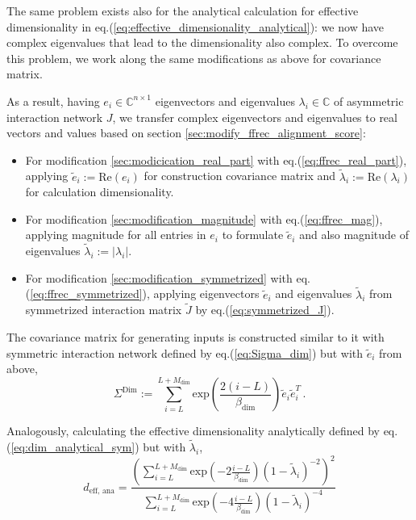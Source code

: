 \documentclass[11pt]{article}
\begin{document}
	The same problem exists also for the analytical calculation for effective dimensionality in  eq.(\ref{eq:effective_dimensionality_analytical}): we now have complex eigenvalues that lead to the dimensionality also complex. To overcome this problem, we work along the same modifications as above for covariance matrix.
				  
	As a result, having $e_i \in \mathbb{C}^{n \times 1}$ eigenvectors and eigenvalues $\lambda_i \in \mathbb{C}$ of asymmetric interaction network $J$, we transfer complex eigenvectors and eigenvalues to real vectors and values based on section \ref{sec:modify_ffrec_alignment_score}: 
	  \begin{itemize}
			  	\item For modification \ref{sec:modicication_real_part} with eq.(\ref{eq:ffrec_real_part}), applying $\tilde{e}_i := \text{Re}(e_i)$ for construction covariance matrix and $\tilde{\lambda}_i := \text{Re}(\lambda_i)$ for calculation dimensionality.
			  	\item For modification \ref{sec:modification_magnitude} with eq.(\ref{eq:ffrec_mag}), applying magnitude for all entries in $e_i$ to formulate $\tilde{e}_i$ and  also magnitude of eigenvalues $\tilde{\lambda}_i := \vert \lambda_i \vert$. 
			  	\item For modification \ref{sec:modification_symmetrized} with eq.(\ref{eq:ffrec_symmetrized}), applying eigenvectors $\tilde{e}_i$ and eigenvalues $\tilde{\lambda}_i$ from symmetrized interaction matrix $\tilde{J}$ by  eq.(\ref{eq:symmetrized_J}).
	  \end{itemize}
			  		
  	 The covariance matrix for generating inputs is constructed similar to it with symmetric interaction network defined by  eq.(\ref{eq:Sigma_dim}) but with $\tilde{e}_i$ from above, 
  	  	\begin{equation} \label{eq:modifications_dim}
  	  		\Sigma^{\text{Dim}} := \sum_{i=L}^{L+M_{\text{dim}}} \text{exp}\left(\frac{2(i-L)}{\beta_{\text{dim}}}\right) \tilde{e}_i \tilde{e}_i^T \, .
  	  	\end{equation}
		  	  	
 	  Analogously, calculating the effective dimensionality analytically defined by eq.(\ref{eq:dim_analytical_sym}) but with $\tilde{\lambda}_i$,
  	  	  	\begin{equation} \label{eq:modification_eff_dim}
  	  	  		d_{\text{eff, ana}} = \frac{\left(\sum_{i = L}^{L + M_{\text{dim}}} \text{exp}\left(-2 \frac{i-L}{\beta_{\text{dim}}}\right)(1-\tilde{\lambda}_i)^{-2}\right)^2}{\sum_{i=L}^{L+M_{\text{dim}}} \text{exp}\left(-4 \frac{i-L}{\beta_{\text{dim}}}\right)(1-\tilde{\lambda}_i)^{-4}}
  	  	  	\end{equation}
		  	  	
\end{document}
